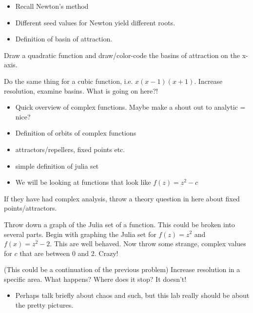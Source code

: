 

\begin{itemize}
\item Recall Newton's method
\item Different seed values for Newton yield different roots.
\item Definition of basin of attraction.
\end{itemize}

\begin{problem}
Draw a quadratic function and draw/color-code the basins of attraction on the x-axis.
\end{problem}
\begin{problem}
Do the same thing for a cubic function, i.e. $x(x-1)(x+1)$.  Increase resolution, examine basins.  What is going on here?!
\end{problem}

\begin{itemize}
\item Quick overview of complex functions.  Maybe make a shout out to analytic = nice?
\item Definition of orbits of complex functions
\item attractors/repellers, fixed points etc.
\item simple definition of julia set
\item We will be looking at functions that look like $f(z)  = z^2 - c$
\end{itemize}

\begin{problem}
If they have had complex analysis, throw a theory question in here about fixed points/attractors.
\end{problem}
\begin{problem}
Throw down a graph of the Julia set of a function.  This could be broken into several parts.  Begin with graphing the Julia set for $f(z) = z^2$ and $f(x) = z^2 - 2$.  This are well behaved.  Now throw some strange, complex values for $c$ that are between 0 and 2.  Crazy!
\end{problem}
\begin{problem}
(This could be a continuation of the previous problem)  Increase resolution in a specific area.  What happens? Where does it stop?  It doesn't!
\end{problem}

\begin{itemize}
\item Perhaps talk briefly about chaos and such, but this lab really should be about the pretty pictures.
\end{itemize}




